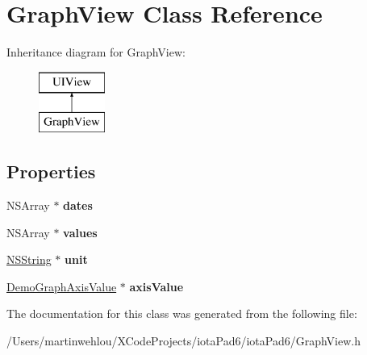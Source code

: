 \hypertarget{interface_graph_view}{
\section{GraphView Class Reference}
\label{interface_graph_view}
}
Inheritance diagram for GraphView:\begin{figure}[H]
\begin{center}
\leavevmode
\includegraphics[height=2.000000cm]{interface_graph_view}
\end{center}
\end{figure}
\subsection*{Properties}
\begin{DoxyCompactItemize}
\item 
\hypertarget{interface_graph_view_a90daf0542c9fd4a90c069c1b413b1d1f}{
NSArray $\ast$ {\bfseries dates}}
\label{interface_graph_view_a90daf0542c9fd4a90c069c1b413b1d1f}

\item 
\hypertarget{interface_graph_view_ab3650c0af7e4fcdfd24a339818d0646c}{
NSArray $\ast$ {\bfseries values}}
\label{interface_graph_view_ab3650c0af7e4fcdfd24a339818d0646c}

\item 
\hypertarget{interface_graph_view_aa142f411e68523df0d77080dd1e2fd84}{
\hyperlink{class_n_s_string}{NSString} $\ast$ {\bfseries unit}}
\label{interface_graph_view_aa142f411e68523df0d77080dd1e2fd84}

\item 
\hypertarget{interface_graph_view_aa65e84d3de2f60942410fcf1926eda2f}{
\hyperlink{interface_demo_graph_axis_value}{DemoGraphAxisValue} $\ast$ {\bfseries axisValue}}
\label{interface_graph_view_aa65e84d3de2f60942410fcf1926eda2f}

\end{DoxyCompactItemize}


The documentation for this class was generated from the following file:\begin{DoxyCompactItemize}
\item 
/Users/martinwehlou/XCodeProjects/iotaPad6/iotaPad6/GraphView.h\end{DoxyCompactItemize}
